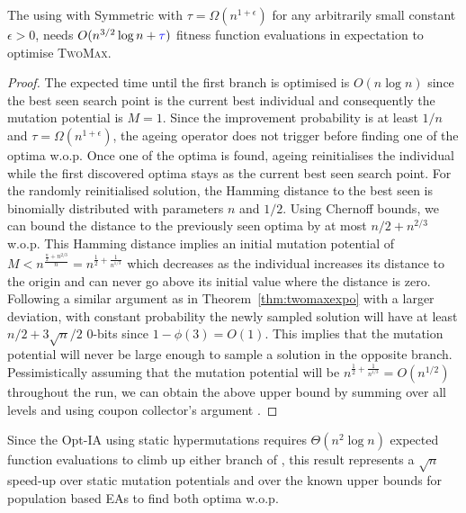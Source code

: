 \documentclass[lettersize,journal]{IEEEtran}
\begin{document}
\begin{theorem} \label{th:MexpoTwoMax}
The {\oneoneOPTIA } using \IPHfcm{} with Symmetric {\expoHD } with $\tau=\Omega(n^{1+\epsilon})$ for any 
arbitrarily small constant $\epsilon>0$, needs
$O(n^{3/2}\log{n} + {\color{blue}\tau})$ fitness function evaluations in expectation to optimise \textsc{TwoMax}.
\end{theorem}
\begin{proof}
The expected time until the first branch is optimised is $O(n\log{n})$ 
since the best seen search point is the current best individual and 
consequently the mutation potential is $M=1$. Since the improvement 
probability is at least $1/n$ and $\tau=\Omega(n^{1+\epsilon})$, the ageing 
operator does not trigger before finding one of the optima w.o.p. Once one of the optima is found, ageing reinitialises the 
individual while the first discovered optima stays as the current best seen 
search point. For the randomly reinitialised solution, the Hamming distance to 
the best seen is binomially distributed with parameters $n$ and $1/2$. Using 
Chernoff bounds, we can bound the distance to the previously seen 
optima by at most $n/2 + n^{2/3}$ w.o.p. This 
Hamming distance implies an initial mutation potential of $M< 
n^{\frac{\frac{n}{2}+n^{2/3}}{n}}=n^{\frac{1}{2}+\frac{1}{n^{1/3}}}$ which 
decreases as the individual increases its distance to the origin and can never 
go above its initial value where the distance is zero. {\color{blue} Following a similar argument as in Theorem~\ref{thm:twomaxexpo} with a larger deviation, with constant probability the newly sampled solution will have at least $n/2 + 3\sqrt{n}/2$ $0$-bits since $1-\phi(3) = O(1)$. This implies that the mutation potential will never be large enough to sample a solution in the opposite branch.}
Pessimistically assuming that the mutation potential will be 
$n^{\frac{1}{2}+\frac{1}{n^{1/3}}}=O(n^{1/2})$ throughout the run, we can obtain 
the above upper bound by summing over all levels and using coupon collector's 
argument \cite{OlivetoBookChapter}.
\end{proof}

Since the Opt-IA using static hypermutations requires $\Theta( n^2 \log n)$ expected function evaluations
to climb up either branch of \twomax{}  \cite{CorusOlivetoYazdani2019TCS}, this result represents a $\sqrt{n}$ speed-up
over static mutation potentials and over the known upper bounds for population based EAs to find both optima w.o.p.
\end{document}
